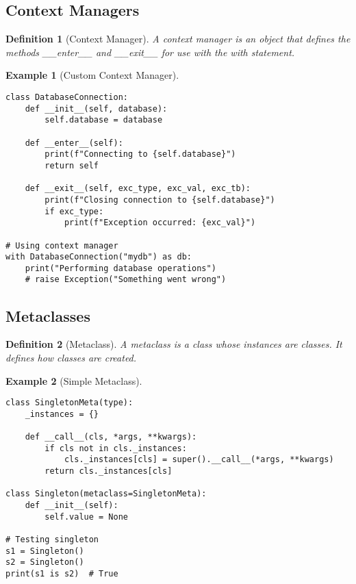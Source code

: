 \documentclass[11pt]{article}
\newtheorem{definition}{Definition}[section]
\newtheorem{example}{Example}[section]
\begin{document}
\subsection{Context Managers}

\begin{definition}[Context Manager]
A context manager is an object that defines the methods \_\_enter\_\_ and \_\_exit\_\_ for use with the with statement.
\end{definition}

\begin{example}[Custom Context Manager]
\begin{lstlisting}
class DatabaseConnection:
    def __init__(self, database):
        self.database = database
    
    def __enter__(self):
        print(f"Connecting to {self.database}")
        return self
    
    def __exit__(self, exc_type, exc_val, exc_tb):
        print(f"Closing connection to {self.database}")
        if exc_type:
            print(f"Exception occurred: {exc_val}")

# Using context manager
with DatabaseConnection("mydb") as db:
    print("Performing database operations")
    # raise Exception("Something went wrong")
\end{lstlisting}
\end{example}

\subsection{Metaclasses}

\begin{definition}[Metaclass]
A metaclass is a class whose instances are classes. It defines how classes are created.
\end{definition}

\begin{example}[Simple Metaclass]
\begin{lstlisting}
class SingletonMeta(type):
    _instances = {}
    
    def __call__(cls, *args, **kwargs):
        if cls not in cls._instances:
            cls._instances[cls] = super().__call__(*args, **kwargs)
        return cls._instances[cls]

class Singleton(metaclass=SingletonMeta):
    def __init__(self):
        self.value = None

# Testing singleton
s1 = Singleton()
s2 = Singleton()
print(s1 is s2)  # True
\end{lstlisting}
\end{example}
\end{document}
